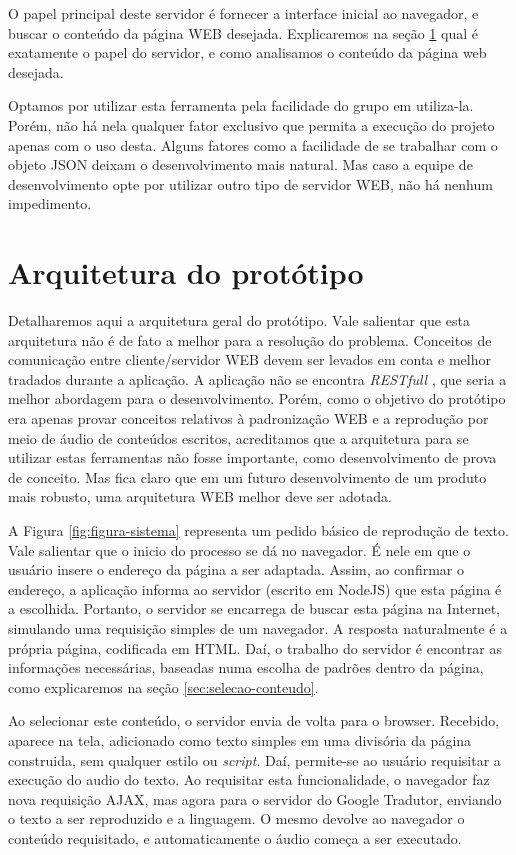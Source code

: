 \documentclass[
	12pt,				%
	oneside,			%
	a4paper,			%
	english,			%
	brazil				%
	]{abntex2ppgsi}
\begin{document}
O papel principal deste servidor é fornecer a interface inicial ao navegador, e buscar o conteúdo da página WEB desejada. Explicaremos na seção \ref{sec:arquitetura_prototipo} qual é exatamente o papel do servidor, e como analisamos o conteúdo da página web desejada. 

Optamos por utilizar esta ferramenta pela facilidade do grupo em utiliza-la. Porém, não há nela qualquer fator exclusivo que permita a execução do projeto apenas com o uso desta. Alguns fatores como a facilidade de se trabalhar com o objeto JSON deixam o desenvolvimento mais natural. Mas caso a equipe de desenvolvimento opte por utilizar outro tipo de servidor WEB, não há nenhum impedimento. 

\section{Arquitetura do protótipo} \label{sec:arquitetura_prototipo}

Detalharemos aqui a arquitetura geral do protótipo. Vale salientar que esta arquitetura não é de fato a melhor para a resolução do problema. Conceitos de comunicação entre cliente/servidor WEB devem ser levados em conta e melhor tradados durante a aplicação. A aplicação não se encontra \textit{RESTfull} \cite{rest}, que seria a melhor abordagem para o desenvolvimento. Porém, como o objetivo do protótipo era apenas provar conceitos relativos à padronização WEB e a reprodução por meio de áudio de conteúdos escritos, acreditamos que a arquitetura para se utilizar estas ferramentas não fosse importante, como desenvolvimento de prova de conceito. Mas fica claro que em um futuro desenvolvimento de um produto mais robusto, uma arquitetura WEB melhor deve ser adotada.

A Figura \ref{fig:figura-sistema} representa um pedido básico de reprodução de texto. Vale salientar que o inicio do processo se dá no navegador. É nele em que o usuário insere o endereço da página a ser adaptada. Assim, ao confirmar o endereço, a aplicação informa ao servidor (escrito em NodeJS) que esta página é a escolhida. Portanto, o servidor se encarrega de buscar esta página na Internet, simulando uma requisição simples de um navegador. A resposta naturalmente é a própria página, codificada em HTML. Daí, o trabalho do servidor é encontrar as informações necessárias, baseadas numa escolha de padrões dentro da página, como explicaremos na seção \ref{sec:selecao-conteudo}. 

Ao selecionar este conteúdo, o servidor envia de volta para o browser. Recebido, aparece na tela, adicionado como texto simples em uma divisória da página construida, sem qualquer estilo ou \textit{script}. Daí, permite-se ao usuário requisitar a execução do audio do texto. Ao requisitar esta funcionalidade, o navegador faz nova requisição AJAX, mas agora para o servidor do Google Tradutor, enviando o texto a ser reproduzido e a linguagem. O mesmo devolve ao navegador o conteúdo requisitado, e automaticamente o áudio começa a ser executado.
\end{document}
